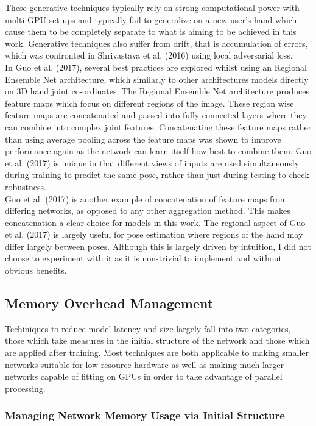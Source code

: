 \documentclass{article}
\begin{document}
These generative techniques typically rely on strong computational power with multi-GPU set ups and typically fail to generalize on a new user's hand which cause them to be completely separate to what is aiming to be achieved in this work. Generative techniques also suffer from drift, that is accumulation of errors, which was confronted in Shrivastava et al. (2016) using local adversarial loss.\\ 

In Guo et al. (2017), several best practices are explored whilst using an Regional Ensemble Net architecture, which similarly to other architectures models directly on 3D hand joint co-ordinates. The Regional Ensemble Net architecture produces feature maps which focus on different regions of the image. These region wise feature maps are concatenated and passed into fully-connected layers where they can combine into complex joint features. Concatenating these feature maps rather than using average pooling across the feature maps was shown to improve performance again as the network can learn itself how best to combine them. Guo et al. (2017) is unique in that different views of inputs are used simultaneously during training to predict the same pose, rather than just during testing to check robustness. \\

Guo et al. (2017) is another example of concatenation of feature maps from differing networks, as opposed to any other aggregation method. This makes concatenation a clear choice for models in this work. The regional aspect of Guo et al. (2017) is largely useful for pose estimation where regions of the hand may differ largely between poses. Although this is largely driven by intuition, I did not choose to experiment with it as it is non-trivial to implement and without obvious benefits. \\

\subsection{Memory Overhead Management}
Techiniques to reduce model latency and size largely fall into two categories, those which take measures in the initial structure of the network and those which are applied after training. Most techniques are both applicable to making smaller networks suitable for low resource hardware as well as making much larger networks capable of fitting on GPUs in order to take advantage of parallel processing.

\subsubsection{Managing Network Memory Usage via Initial Structure}
\end{document}
